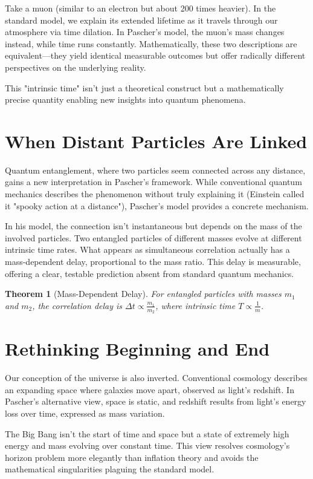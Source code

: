 \documentclass[a4paper,12pt]{article}
\newtheorem{theorem}{Theorem}[section]
\begin{document}
	Take a muon (similar to an electron but about 200 times heavier). In the standard model, we explain its extended lifetime as it travels through our atmosphere via time dilation. In Pascher’s model, the muon’s mass changes instead, while time runs constantly. Mathematically, these two descriptions are equivalent—they yield identical measurable outcomes but offer radically different perspectives on the underlying reality.
	
	This "intrinsic time" isn’t just a theoretical construct but a mathematically precise quantity enabling new insights into quantum phenomena.
	
	\section{When Distant Particles Are Linked}
	Quantum entanglement, where two particles seem connected across any distance, gains a new interpretation in Pascher’s framework. While conventional quantum mechanics describes the phenomenon without truly explaining it (Einstein called it "spooky action at a distance"), Pascher’s model provides a concrete mechanism.
	
	In his model, the connection isn’t instantaneous but depends on the mass of the involved particles. Two entangled particles of different masses evolve at different intrinsic time rates. What appears as simultaneous correlation actually has a mass-dependent delay, proportional to the mass ratio. This delay is measurable, offering a clear, testable prediction absent from standard quantum mechanics.
	
	\begin{theorem}[Mass-Dependent Delay]
		For entangled particles with masses $m_1$ and $m_2$, the correlation delay is $\Delta t \propto \frac{m_1}{m_2}$, where intrinsic time $T \propto \frac{1}{m}$.
	\end{theorem}
	
	\section{Rethinking Beginning and End}
	Our conception of the universe is also inverted. Conventional cosmology describes an expanding space where galaxies move apart, observed as light’s redshift. In Pascher’s alternative view, space is static, and redshift results from light’s energy loss over time, expressed as mass variation.
	
	The Big Bang isn’t the start of time and space but a state of extremely high energy and mass evolving over constant time. This view resolves cosmology’s horizon problem more elegantly than inflation theory and avoids the mathematical singularities plaguing the standard model.
	
\end{document}
